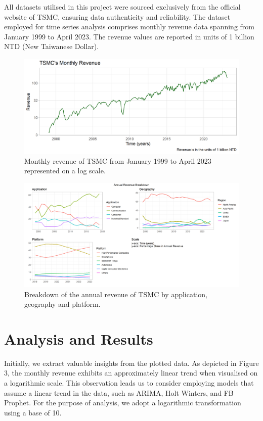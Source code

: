 \documentclass[
]{article}
\begin{document}
All datasets utilised in this project were sourced exclusively from the
official website of TSMC, ensuring data authenticity and reliability.
The dataset employed for time series analysis comprises monthly revenue
data spanning from January 1999 to April 2023. The revenue values are
reported in units of 1 billion NTD (New Taiwanese Dollar).

\begin{figure}
\centering
\includegraphics{Plots/RevenuePlot.png}
\caption{Monthly revenue of TSMC from January 1999 to April 2023
represented on a log scale.}
\end{figure}

\begin{figure}
\centering
\includegraphics{Plots/RevenueBreakdown.png}
\caption{Breakdown of the annual revenue of TSMC by application,
geography and platform.}
\end{figure}

\hypertarget{analysis-and-results}{%
\section{Analysis and Results}\label{analysis-and-results}}

Initially, we extract valuable insights from the plotted data. As
depicted in Figure 3, the monthly revenue exhibits an approximately
linear trend when visualised on a logarithmic scale. This observation
leads us to consider employing models that assume a linear trend in the
data, such as ARIMA, Holt Winters, and FB Prophet. For the purpose of
analysis, we adopt a logarithmic transformation using a base of 10.
\end{document}

